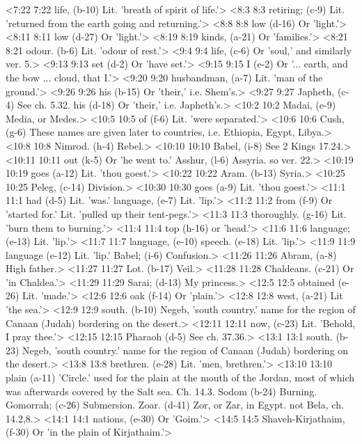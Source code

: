 <7:22 7:22  life, (b-10)  Lit. 'breath of spirit of life.'>
<8:3 8:3  retiring; (c-9)  Lit. 'returned from the earth going and returning.'>
<8:8 8:8  low (d-16) Or 'light.'>
<8:11 8:11  low (d-27)  Or 'light.'>
<8:19 8:19  kinds, (a-21)  Or 'families.'>
<8:21 8:21  odour. (b-6)  Lit. 'odour of rest.'>
<9:4 9:4  life, (c-6)  Or 'soul,' and similarly ver. 5.>
<9:13 9:13  set (d-2)  Or 'have set.'>
<9:15 9:15  I (e-2)  Or '... earth, and the bow ... cloud, that I.'>
<9:20 9:20  husbandman, (a-7)  Lit. 'man of the ground.'>
<9:26 9:26  his (b-15)  Or 'their,' i.e. Shem's.>
<9:27 9:27  Japheth, (c-4)  See ch. 5.32.
  his (d-18)  Or 'their,' i.e. Japheth's.>
<10:2 10:2  Madai, (e-9)  Media, or Medes.>
<10:5 10:5  of (f-6)  Lit. 'were separated.'>
<10:6 10:6  Cush, (g-6)  These names are given later to countries, i.e. Ethiopia,  Egypt, Libya.>
<10:8 10:8  Nimrod. (h-4)  Rebel.>
<10:10 10:10  Babel, (i-8)  See 2 Kings 17.24.>
<10:11 10:11  out (k-5)  Or 'he went to.'
  Asshur, (l-6)  Assyria. so ver. 22.>
<10:19 10:19  goes (a-12) Lit. 'thou goest.'>
<10:22 10:22  Aram. (b-13)  Syria.>
<10:25 10:25  Peleg, (c-14)  Division.>
<10:30 10:30  goes (a-9)  Lit. 'thou goest.'>
<11:1 11:1  had (d-5)  Lit. 'was.'
  language, (e-7) Lit. 'lip.'>
<11:2 11:2  from (f-9)  Or 'started for.' Lit. 'pulled up their tent-pegs.'>
<11:3 11:3  thoroughly. (g-16)  Lit. 'burn them to burning.'>
<11:4 11:4  top (h-16)  or 'head.'>
<11:6 11:6  language; (e-13) Lit. 'lip.'>
<11:7 11:7  language, (e-10)  speech. (e-18)
   Lit. 'lip.'>
<11:9 11:9  language (e-12)  Lit. 'lip.'
  Babel; (i-6)  Confusion.>
<11:26 11:26  Abram, (a-8)  High father.>
<11:27 11:27  Lot. (b-17)  Veil.>
<11:28 11:28  Chaldeans. (c-21)  Or 'in Chaldea.'>
<11:29 11:29  Sarai; (d-13)  My princess.>
<12:5 12:5  obtained (e-26)  Lit. 'made.'>
<12:6 12:6  oak (f-14)  Or 'plain.'>
<12:8 12:8  west, (a-21)  Lit 'the sea.'>
<12:9 12:9  south. (b-10) Negeb, 'south country.' name for the region of Canaan (Judah) bordering on the desert.>
<12:11 12:11  now, (c-23)  Lit. 'Behold, I pray thee.'>
<12:15 12:15  Pharaoh (d-5)  See ch. 37.36.>
<13:1 13:1  south. (b-23)  Negeb, 'south country.' name for the region of Canaan  (Judah) bordering on the desert.>
<13:8 13:8  brethren. (e-28)  Lit. 'men, brethren.'>
<13:10 13:10  plain (a-11)  'Circle.' used for the plain at the mouth of the Jordan, most  of which was afterwards covered by the Salt sea. Ch. 14.3.
  Sodom (b-24)  Burning.
  Gomorrah; (c-26)  Submersion.
  Zoar. (d-41)  Zor, or Zar, in Egypt. not Bela, ch. 14.2,8.>
<14:1 14:1  nations, (e-30)  Or 'Goim.'>
<14:5 14:5  Shaveh-Kirjathaim, (f-30)  Or 'in the plain of Kirjathaim.'>
